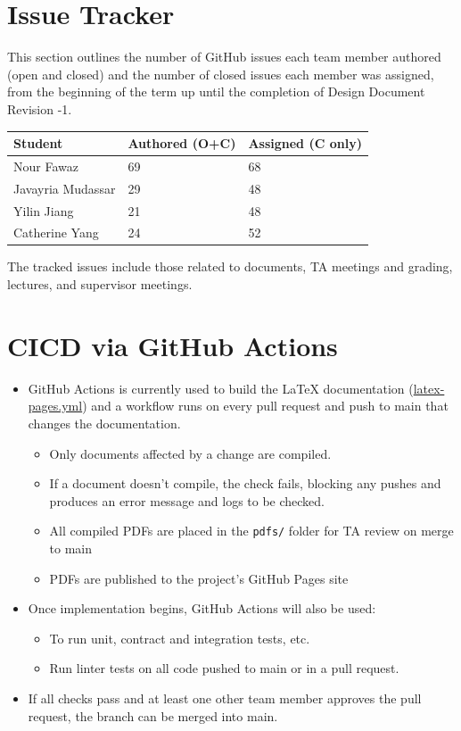 \documentclass{article}
\begin{document}
\section{Issue Tracker}

This section outlines the number of GitHub issues each team member authored
(open and closed) and the number of closed issues each member was assigned, from
the beginning of the term up until the completion of Design Document Revision -1.

\begin{table}[H]
\centering
\begin{tabular}{lll}
\toprule
\textbf{Student} & \textbf{Authored (O+C)} & \textbf{Assigned (C only)}\\
\midrule
Nour Fawaz & 69 & 68 \\
Javayria Mudassar & 29 & 48 \\
Yilin Jiang & 21 & 48 \\
Catherine Yang & 24 & 52 \\
\bottomrule
\end{tabular}
\end{table}

\noindent
The tracked issues include those related to documents, TA meetings and grading,
lectures, and supervisor meetings.

\section{CICD via GitHub Actions}

\begin{itemize}
    \item GitHub Actions is currently used to build the LaTeX documentation
    (\href{https://github.com/Nour-Fawaz/MacaBoca/blob/main/.github/workflows/latex-pages.yml}{latex-pages.yml})
    and a workflow runs on every pull request and push to main that changes the documentation.
    \begin{itemize}
        \item Only documents affected by a change are compiled.
        \item If a document doesn't compile, the check fails, blocking any pushes and produces an error message and logs to be checked.
        \item All compiled PDFs are placed in the \texttt{pdfs/} folder for TA review on merge to main
        \item PDFs are published to the project's GitHub Pages site
    \end{itemize}
    \item Once implementation begins, GitHub Actions will also be used:
    \begin{itemize}
        \item To run unit, contract and integration tests, etc.
        \item Run linter tests on all code pushed to main or in a pull request.
    \end{itemize}
    \item If all checks pass and at least one other team member approves the pull request, the branch can be merged into main.
\end{itemize}
\end{document}
